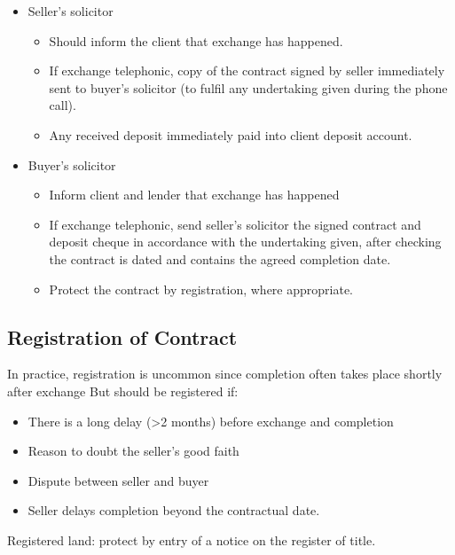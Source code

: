 \documentclass[
]{article}
\providecommand{\tightlist}{%
  \setlength{\itemsep}{0pt}\setlength{\parskip}{0pt}}
\begin{document}
\begin{itemize}
\tightlist
\item
  Seller's solicitor

  \begin{itemize}
  \tightlist
  \item
    Should inform the client that exchange has happened.
  \item
    If exchange telephonic, copy of the contract signed by seller
    immediately sent to buyer's solicitor (to fulfil any undertaking
    given during the phone call).
  \item
    Any received deposit immediately paid into client deposit account.
  \end{itemize}
\item
  Buyer's solicitor

  \begin{itemize}
  \tightlist
  \item
    Inform client and lender that exchange has happened
  \item
    If exchange telephonic, send seller's solicitor the signed contract
    and deposit cheque in accordance with the undertaking given, after
    checking the contract is dated and contains the agreed completion
    date.
  \item
    Protect the contract by registration, where appropriate.
  \end{itemize}
\end{itemize}

\hypertarget{registration-of-contract}{%
\subsection{Registration of Contract}\label{registration-of-contract}}

In practice, registration is uncommon since completion often takes place
shortly after exchange But should be registered if:

\begin{itemize}
\tightlist
\item
  There is a long delay (\textgreater2 months) before exchange and
  completion
\item
  Reason to doubt the seller's good faith
\item
  Dispute between seller and buyer
\item
  Seller delays completion beyond the contractual date.
\end{itemize}

Registered land: protect by entry of a notice on the register of title.
\end{document}
